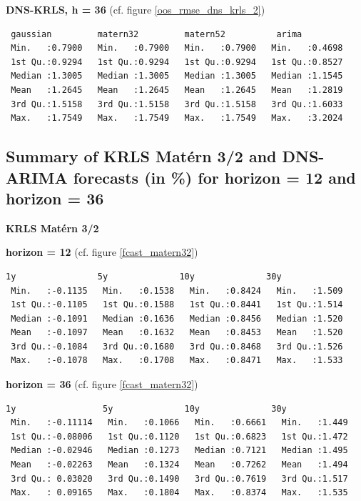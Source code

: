 \begin{table}[!htb]
\textbf{DNS-KRLS, h = 36} (cf. figure \ref{oos_rmse_dns_krls_2})

\begin{verbatim}
 gaussian         matern32         matern52          arima       
 Min.   :0.7900   Min.   :0.7900   Min.   :0.7900   Min.   :0.4698  
 1st Qu.:0.9294   1st Qu.:0.9294   1st Qu.:0.9294   1st Qu.:0.8527  
 Median :1.3005   Median :1.3005   Median :1.3005   Median :1.1545  
 Mean   :1.2645   Mean   :1.2645   Mean   :1.2645   Mean   :1.2819  
 3rd Qu.:1.5158   3rd Qu.:1.5158   3rd Qu.:1.5158   3rd Qu.:1.6033  
 Max.   :1.7549   Max.   :1.7549   Max.   :1.7549   Max.   :3.2024  
\end{verbatim}



\subsection{Summary of KRLS Mat\'ern 3/2 and DNS-ARIMA forecasts (in \%) for horizon = 12 and horizon = 36}
\label{appendix_summary_forecast}

\textbf{KRLS Mat\'ern 3/2}

\textbf{horizon = 12} (cf. figure \ref{fcast_matern32})

\begin{verbatim}
1y                5y              10y              30y       
 Min.   :-0.1135   Min.   :0.1538   Min.   :0.8424   Min.   :1.509  
 1st Qu.:-0.1105   1st Qu.:0.1588   1st Qu.:0.8441   1st Qu.:1.514  
 Median :-0.1091   Median :0.1636   Median :0.8456   Median :1.520  
 Mean   :-0.1097   Mean   :0.1632   Mean   :0.8453   Mean   :1.520  
 3rd Qu.:-0.1084   3rd Qu.:0.1680   3rd Qu.:0.8468   3rd Qu.:1.526  
 Max.   :-0.1078   Max.   :0.1708   Max.   :0.8471   Max.   :1.533
\end{verbatim}

\textbf{horizon = 36} (cf. figure \ref{fcast_matern32})

\begin{verbatim}
1y                 5y              10y              30y       
 Min.   :-0.11114   Min.   :0.1066   Min.   :0.6661   Min.   :1.449  
 1st Qu.:-0.08006   1st Qu.:0.1120   1st Qu.:0.6823   1st Qu.:1.472  
 Median :-0.02946   Median :0.1273   Median :0.7121   Median :1.495  
 Mean   :-0.02263   Mean   :0.1324   Mean   :0.7262   Mean   :1.494  
 3rd Qu.: 0.03020   3rd Qu.:0.1490   3rd Qu.:0.7619   3rd Qu.:1.517  
 Max.   : 0.09165   Max.   :0.1804   Max.   :0.8374   Max.   :1.535 
\end{verbatim}


\end{table}
